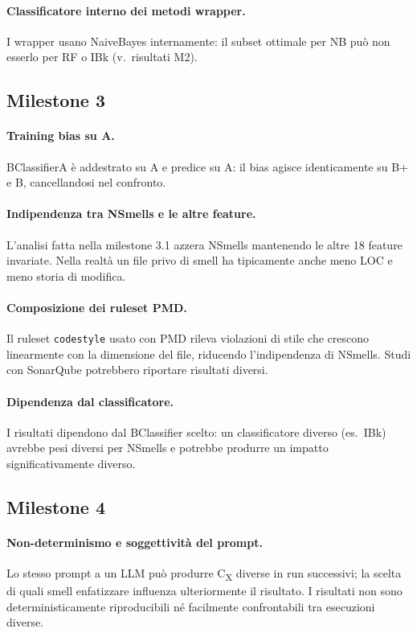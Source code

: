 \paragraph{Classificatore interno dei metodi wrapper.}
I wrapper usano NaiveBayes internamente: il subset ottimale per NB può non esserlo per RF
o IBk (v.\ risultati M2).

\subsection{Milestone 3}

\paragraph{Training bias su A.}
BClassifierA è addestrato su A e predice su A: il bias agisce identicamente
su B+ e B, cancellandosi nel confronto.

\paragraph{Indipendenza tra NSmells e le altre feature.}
L'analisi fatta nella milestone 3.1 azzera NSmells mantenendo le altre 18 feature invariate. Nella realtà
un file privo di smell ha tipicamente anche meno LOC e meno storia di modifica.

\paragraph{Composizione dei ruleset PMD.}
Il ruleset \texttt{codestyle} usato con PMD rileva violazioni di stile che crescono linearmente con la
dimensione del file, riducendo l'indipendenza di NSmells. Studi con SonarQube potrebbero riportare risultati diversi.

\paragraph{Dipendenza dal classificatore.}
I risultati dipendono dal BClassifier scelto: un classificatore diverso (es.\ IBk) avrebbe
pesi diversi per NSmells e potrebbe produrre un impatto significativamente diverso.

\subsection{Milestone 4}

\paragraph{Non-determinismo e soggettività del prompt.}
Lo stesso prompt a un LLM può produrre C\textsubscript{X} diverse in run successivi;
la scelta di quali smell enfatizzare influenza ulteriormente il risultato. I risultati
non sono deterministicamente riproducibili né facilmente confrontabili tra esecuzioni diverse.



